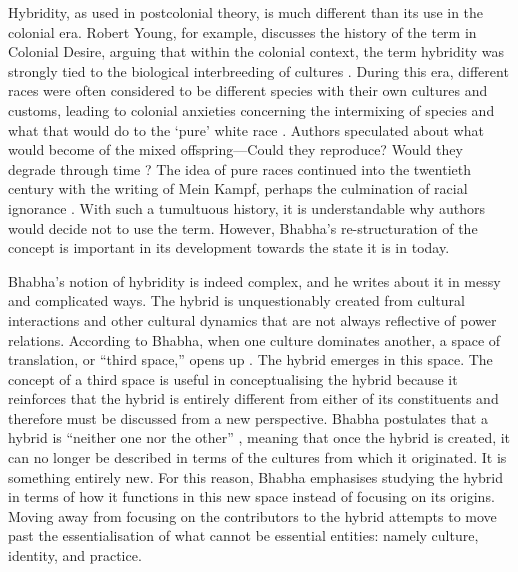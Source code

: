 	Hybridity, as used in postcolonial theory, is much different than its use in the colonial era. Robert Young, for example, discusses the history of the term in Colonial Desire, arguing that within the colonial context, the term hybridity was strongly tied to the biological interbreeding of cultures \parencite[6]{Young_1995}. During this era, different races were often considered to be different species with their own cultures and customs, leading to colonial anxieties concerning the intermixing of species and what that would do to the ‘pure’ white race \parencite[6]{Young_1995}. Authors speculated about what would become of the mixed offspring—Could they reproduce? 
Would they degrade through time \parencite[8]{Young_1995}?  
The idea of pure races continued into the twentieth century with the writing of Mein Kampf, perhaps the culmination of racial ignorance \parencite[8]{Young_1995}. With such a tumultuous history, it is understandable why authors would decide not to use the term. However, Bhabha’s re-structuration of the concept is important in its development towards the state it is in today. 
	
	
	Bhabha’s notion of hybridity is indeed complex, and he writes about it in messy and complicated ways. The hybrid is unquestionably created from cultural interactions and other cultural dynamics that are not always reflective of power relations. According to Bhabha, when one culture dominates another, a space of translation, or “third space,” opens up \parencite[53]{Bhabha_1994}. The hybrid emerges in this space. The concept of a third space is useful in conceptualising the hybrid because it reinforces that the hybrid is entirely different from either of its constituents and therefore must be discussed from a new perspective. Bhabha postulates that a hybrid is “neither one nor the other” \parencite[49]{Bhabha_1994} , meaning that once the hybrid is created, it can no longer be described in terms of the cultures from which it originated. It is something entirely new. For this reason, Bhabha emphasises studying the hybrid in terms of how it functions in this new space instead of focusing on its origins. Moving away from focusing on the contributors to the hybrid attempts to move past the essentialisation of what cannot be essential entities: namely culture, identity, and practice. 
	
